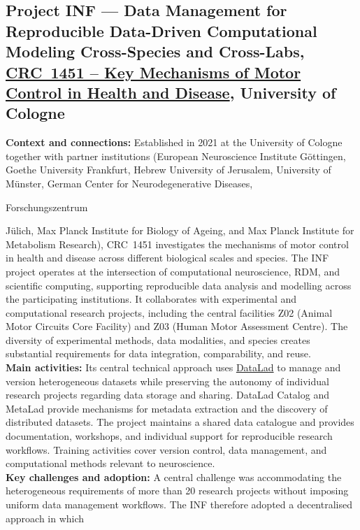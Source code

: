 \documentclass{eceasst}
\newenvironment{de}{\begin{otherlanguage}{ngerman}}{\end{otherlanguage}}
\begin{document}
\subsection{Project INF --- Data Management for Reproducible Data-Driven Computational Modeling Cross-Species and Cross-Labs,
\href{https://gepris.dfg.de/gepris/projekt/458705875?language=en}{CRC~1451 -- Key Mechanisms of Motor Control in Health and Disease},
University of Cologne}
\label{subsec:crc1451}
\noindent\textbf{Context and connections:}
Established in 2021 at the University of Cologne together with partner institutions (European Neuroscience Institute Göttingen, Goethe University Frankfurt, Hebrew University of Jerusalem, University of Münster, German Center for Neurodegenerative Diseases, \begin{de}Forschungszentrum\end{de} Jülich, Max Planck Institute for Biology of Ageing, and Max Planck Institute for Metabolism Research), CRC~1451 investigates the mechanisms of motor control in health
and disease across different biological scales and species.
The INF project operates at the intersection of computational
neuroscience, RDM, and scientific computing, supporting reproducible data analysis and modelling
across the participating institutions.
It collaborates with experimental and computational research
projects, including the central facilities Z02 (Animal Motor
Circuits Core Facility) and Z03 (Human Motor Assessment Centre).
The diversity of experimental methods, data modalities, and
species creates substantial requirements for data integration,
comparability, and reuse.
\\
\noindent\textbf{Main activities:}
Its central technical approach uses
\href{https://www.datalad.org/}{DataLad} to manage and
version heterogeneous datasets while preserving the autonomy
of individual research projects regarding data storage and
sharing.
DataLad Catalog and MetaLad provide mechanisms for metadata
extraction and the discovery of distributed datasets.
The project maintains a shared data catalogue and provides
documentation, workshops, and individual support for
reproducible research workflows.
Training activities cover version control, data management,
and computational methods relevant to neuroscience.
\\
\noindent\textbf{Key challenges and adoption:}
A central challenge was accommodating the heterogeneous
requirements of more than 20 research projects without
imposing uniform data management workflows.
The INF therefore adopted a decentralised approach in which
\end{document}
